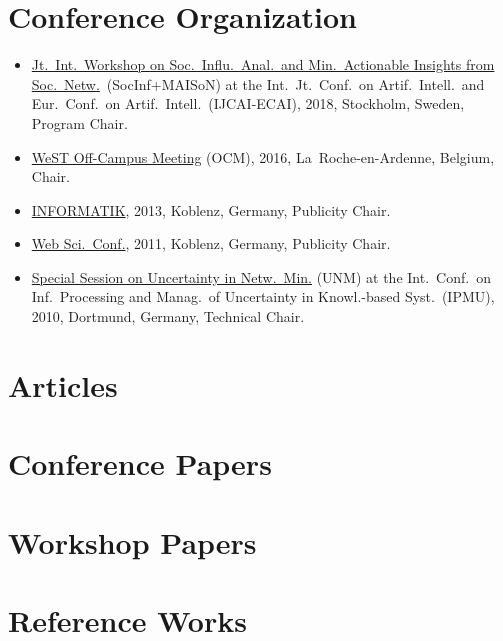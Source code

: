 \documentclass[line,mm]{res}
\newcounter{y}
\begin{document}
\begin{resume}
\section{Conference Organization}
\begin{itemize}
\item
  \href{http://socinf-maison-2018.isistan.unicen.edu.ar/}{Jt.\ Int.\ Workshop on Soc.\ Influ.\ Anal.\ and Min.\ Actionable Insights from Soc.\ Netw.}\ (SocInf+MAISoN) at the Int.\ Jt.\ Conf.\ on Artif.\ Intell.\ and Eur.\ Conf.\ on Artif.\ Intell.\ (IJCAI-ECAI), 2018, Stockholm, Sweden, Program Chair.
\item 
  \href{https://sites.google.com/site/ocm2016/}{WeST Off-Campus
  Meeting} (OCM), 2016, La~Roche-en-Ardenne, Belgium, Chair. 
\item
  \href{http://informatik2013.de/}{INFORMATIK}, 2013, Koblenz, Germany, Publicity Chair. 
\item
  \href{http://www.websci11.org/}{Web Sci.\ Conf.}, 2011, Koblenz, Germany,
  Publicity Chair.  
\item
  \href{http://www.dai-labor.de/unm2010/}{Special Session on
  Uncertainty in Netw.\ Min.} (UNM) at the Int.\ Conf.\ on Inf.\ Processing and Manag.\ of Uncertainty in Knowl.-based Syst.\ (IPMU),
  2010, Dortmund, Germany, Technical Chair.   
\end{itemize}

\section{Articles}           
\section{Conference Papers}  
\section{Workshop Papers}    
\section{Reference Works}    

\end{resume}
\end{document}
